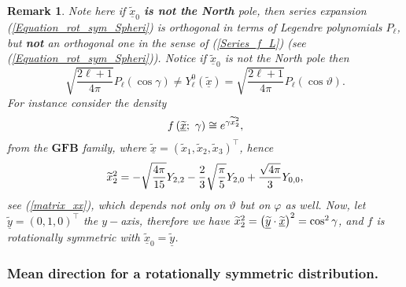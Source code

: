 \documentclass[preprint,11pt,a4paper]{elsarticle}
\newtheorem{remark}[theorem]{Remark}
\begin{document}
\begin{remark}
Note here if $\underline{\widetilde{x}}_{0}$ \textbf{is not the North} pole,
then series expansion (\ref{Equation_rot_sym_Spheri}) is orthogonal in terms
of Legendre polynomials $P_{\ell}$, but \textbf{not } an orthogonal one in
the sense of (\ref{Series_f_L}) (see (\ref{Equation_rot_sym_Spheri})).
Notice if $\underline{\widetilde{x}}_{0}$ is not the North pole then 
\begin{equation*}
\sqrt{\frac{2\ell+1}{4\pi}}P_{\ell}\left( \cos\gamma\right) \neq Y_{\ell
}^{0}\left( \underline{\widetilde{x}}\right) =\sqrt{\frac{2\ell+1}{4\pi}}%
P_{\ell}\left( \cos\vartheta\right) .
\end{equation*}
For instance consider the density 
\begin{equation}
f\left( \underline{\widetilde{x}};\ \gamma\right) \cong e^{\gamma \widetilde{%
x}_{2}^{2}},  \label{Dens_Bingh_1}
\end{equation}
from the $\mathbf{GFB}$ family, where $\underline{\widetilde{x}}=\left( 
\widetilde{x}_{1},\widetilde{x}_{2},\widetilde{x}_{3}\right) ^{\top}$, hence 
\begin{equation*}
\widetilde{x}_{2}^{2}=-\sqrt{\frac{4\pi}{15}}Y_{2,2}-\frac{2}{3}\sqrt {\frac{%
\pi}{5}}Y_{2,0}+\frac{\sqrt{4\pi}}{3}Y_{0,0},
\end{equation*}
see (\ref{matrix_xx}), which depends not only on $\vartheta$ but on $\varphi$
as well. Now, let $\underline{\widetilde{y}}=\left( 0,1,0\right) ^{\top}$
the $y-$axis, therefore we have $\widetilde{x}_{2}^{2}=\left( \underline{%
\widetilde{y}}\cdot\underline{\widetilde{x}}\right) ^{2}=\cos ^{2}\gamma$,
and $f$ is rotationally symmetric with $\underline{\widetilde{x}}_{0}=%
\underline{\widetilde{y}}$.
\end{remark}

\subsubsection{Mean direction for a rotationally symmetric distribution.}
\end{document}
